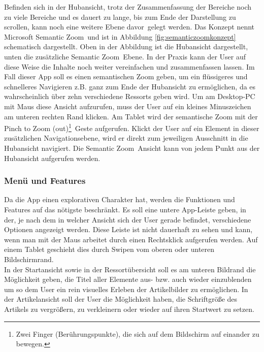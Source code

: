 \documentclass[12pt,a4paper,bibtotoc,abstracton]{scrartcl}
\begin{document}
Befinden sich in der Hubansicht, trotz der Zusammenfassung der Bereiche noch zu viele Bereiche und es dauert zu lange, bis zum Ende der Darstellung zu scrollen, kann noch eine weitere Ebene \glqq davor\grqq\ gelegt werden. Das Konzept nennt Microsoft \glqq Semantic Zoom\grqq\ und ist in Abbildung \ref{fig:semanticzoomkonzept} schematisch dargestellt. Oben in der Abbildung ist die Hubansicht dargestellt, unten die zusätzliche \glqq Semantic Zoom\grqq\ Ebene. In der Praxis kann der User auf diese Weise die Inhalte noch weiter vereinfachen und zusammenfassen lassen. Im Fall dieser App soll es einen semantischen Zoom geben, um ein flüssigeres und schnelleres Navigieren z.B. ganz zum Ende der Hubansicht zu ermöglichen, da es wahrscheinlich über zehn verschiedene Ressorts geben wird. Um am Desktop-PC mit Maus diese Ansicht aufzurufen, muss der User auf ein kleines Minuszeichen am unteren rechten Rand klicken. Am Tablet wird der semantische Zoom mit der \glqq Pinch to Zoom (out)\footnote{Zwei Finger (Berührungspunkte), die sich auf dem Bildschirm auf einander zu bewegen.}\grqq\  Geste aufgerufen. Klickt der User auf ein Element in dieser zusätzlichen Navigationsebene, wird er direkt zum jeweiligen Ausschnitt in die Hubansicht navigiert. Die \glqq Semantic Zoom\grqq\ Ansicht kann von jedem Punkt aus der Hubansicht aufgerufen werden.  

\subsubsection{Menü und Features}
\label{subsubsec:menuandproperties}
Da die App einen explorativen Charakter hat, werden die Funktionen und Features auf das nötigste beschränkt. Es soll eine untere App-Leiste geben, in der, je nach dem in welcher Ansicht sich der User gerade befindet, verschiedene Optionen angezeigt werden. Diese Leiste ist nicht dauerhaft zu sehen und kann, wenn man mit der Maus arbeitet durch einen Rechtsklick aufgerufen werden. Auf einem Tablet geschieht dies durch Swipen vom oberen oder unteren Bildschirmrand.\\
In der Startansicht sowie in der Ressortübersicht soll es am unteren Bildrand die Möglichkeit geben, die Titel aller Elemente aus- bzw. auch wieder einzublenden um so dem User ein rein visuelles Erleben der Artikelbilder zu ermöglichen. In der Artikelansicht soll der User die Möglichkeit haben, die Schriftgröße des Artikels zu vergrößern, zu verkleinern oder wieder auf ihren Startwert zu setzen. 
\end{document}
